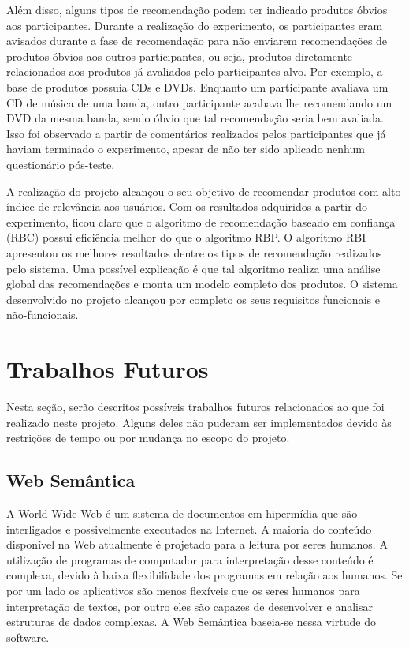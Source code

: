   Além disso, alguns tipos de recomendação podem ter indicado produtos óbvios aos participantes. Durante a realização do experimento, os participantes eram avisados durante a fase de recomendação para não enviarem recomendações de produtos óbvios aos outros participantes, ou seja, produtos diretamente relacionados aos produtos já avaliados pelo participantes alvo. Por exemplo, a base de produtos possuía CDs e DVDs. Enquanto um participante avaliava um CD de música de uma banda, outro participante acabava lhe recomendando um DVD da mesma banda, sendo óbvio que tal recomendação seria bem avaliada. Isso foi observado a partir de comentários realizados pelos participantes que já haviam terminado o experimento, apesar de não ter sido aplicado nenhum questionário pós-teste.

  A realização do projeto alcançou o seu objetivo de recomendar produtos com alto índice de relevância aos usuários. Com os resultados adquiridos a partir do experimento, ficou claro que o algoritmo de recomendação baseado em confiança (RBC) possui eficiência melhor do que o algoritmo RBP. O algoritmo RBI apresentou os melhores resultados dentre os tipos de recomendação realizados pelo sistema. Uma possível explicação é que tal algoritmo realiza uma análise global das recomendações e monta um modelo completo dos produtos. O sistema desenvolvido no projeto alcançou por completo os seus requisitos funcionais e não-funcionais.


\section{Trabalhos Futuros}
\label{sec:trabalho_futuros}

 Nesta seção, serão descritos possíveis trabalhos futuros relacionados ao que foi realizado neste projeto. Alguns deles não puderam ser implementados devido às restrições de tempo ou por mudança no escopo do projeto.

\subsection{Web Semântica} %
\label{sub:web_semantica}

 A World Wide Web é um sistema de documentos em hipermídia que são interligados e possivelmente executados na Internet. A maioria do conteúdo disponível na Web atualmente é projetado para a leitura por seres humanos. A utilização de programas de computador para interpretação desse conteúdo é complexa, devido à baixa flexibilidade dos programas em relação aos humanos. Se por um lado os aplicativos são menos flexíveis que os seres humanos para interpretação de textos, por outro eles são capazes de desenvolver e analisar estruturas de dados complexas. A Web Semântica baseia-se nessa virtude do software. 

